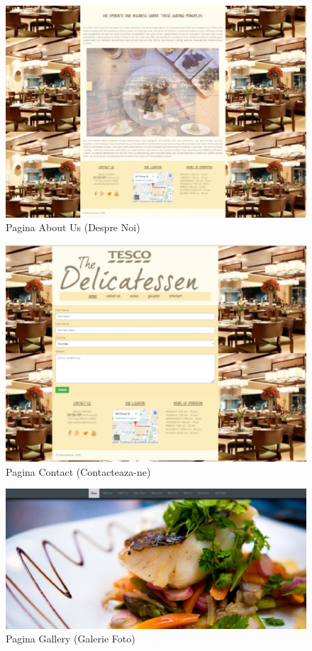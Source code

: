 \documentclass[11pt]{article}
\begin{document}
\begin{figure}[h]
\includegraphics{images/31.eps}
\caption{Pagina About Us (Despre Noi)}
\end{figure}

\begin{figure}[h]
\includegraphics{images/4.eps}
\caption{Pagina Contact (Contacteaza-ne)}
\end{figure}

\begin{figure}[h]
\includegraphics{images/5.eps}
\caption{Pagina Gallery (Galerie Foto)}
\end{figure}
\end{document}
